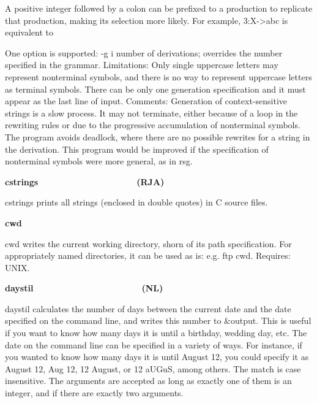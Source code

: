 {

A positive integer followed by a colon can be prefixed to a production
to replicate that production, making its selection more likely. For
example, \textsf{3:X-{\textgreater}abc} is equivalent to




One option is supported: \textsf{{}-g i} number of derivations;
overrides the number specified in the grammar. Limitations: Only single
uppercase letters may represent nonterminal symbols, and there is no
way to represent uppercase letters as terminal symbols. There can be
only one generation specification and it must appear as the last line
of input. Comments: Generation of context-sensitive strings is a slow
process. It may not terminate, either because of a loop in the
rewriting rules or due to the progressive accumulation of nonterminal
symbols. The program avoids deadlock, where there are no possible
rewrites for a string in the derivation. This program would be improved
if the specification of nonterminal symbols were more general, as in
\textsf{rsg}.

{\sffamily\bfseries
cstrings\ \ \ \ \ \ \ \ \ \ \ \ \ \ \ \ \ \ \ \ (RJA)}

\textsf{cstrings} prints all strings (enclosed in double quotes) in C
source files. 

{\sffamily\bfseries
cwd\ \ \ \ \ \ \ \ \ \ \ \ \ \ \ \ \ \ \ \ \ \ }

\textsf{cwd} writes the current working directory, shorn of its path
specification. For appropriately named directories, it can be used as
is: e.g. \textsf{ftp {\textasciigrave}cwd{\textasciigrave}}. Requires:
UNIX. 

{\sffamily\bfseries
daystil\ \ \ \ \ \ \ \ \ \ \ \ \ \ \ \ \ \ \ \  \ \ (NL)}

\textsf{daystil} calculates the number of days between the current date
and the date specified on the command line, and writes this number to
\&output. This is useful if you want to know how many days it is until
a birthday, wedding day, etc. The date on the command line can be
specified in a variety of ways. For instance, if you wanted to know how
many days it is until August 12, you could specify it as
{\textquotedbl}August 12{\textquotedbl}, {\textquotedbl}Aug
12{\textquotedbl}, {\textquotedbl}12 August{\textquotedbl}, or
{\textquotedbl}12 aUGuS{\textquotedbl}, among others. The match is case
insensitive. The arguments are accepted as long as exactly one of them
is an integer, and if there are exactly two arguments. 

}
